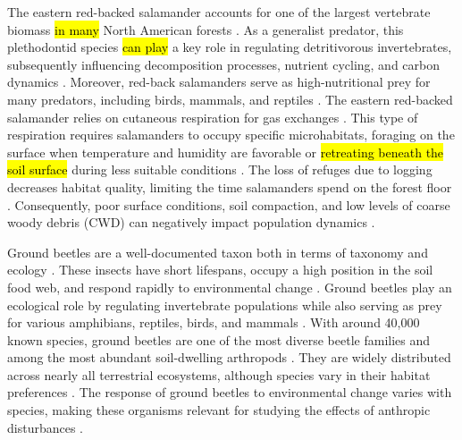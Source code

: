 The eastern red-backed salamander accounts for one of the largest vertebrate biomass \hl{in many} North American forests \citep{Burton1975Salamanderpopulations,Petranka1993Effectstimber,semlitschAbundanceBiomassProduction2014a}. 
As a generalist predator, this plethodontid species \hl{can play} a key role in regulating detritivorous invertebrates, subsequently influencing decomposition processes, nutrient cycling, and carbon dynamics \citep{Burton1975Energyflow,Wyman1998Experimentalassessment,Walton2013Topdownregulation,Hickerson2017Easternredbacked}. 
Moreover, red-back salamanders serve as high-nutritional prey for many predators, including birds, mammals, and reptiles \citep{Burton1975Energyflow,Pough1987abundancesalamanders}. 
The eastern red-backed salamander relies on cutaneous respiration for gas exchanges \citep{Heatwole1961Relationsubstrate}. 
This type of respiration requires salamanders to occupy specific microhabitats, foraging on the surface when temperature and humidity are favorable or \hl{retreating beneath the soil surface} during less suitable conditions \citep{Grizzell1949HibernationSite,FraserEmpiricalEvaluation1976,Jaeger1980MicrohabitatsTerrestrial}. 
The loss of refuges due to logging decreases habitat quality, limiting the time salamanders spend on the forest floor \citep{Achat2015Quantifyingconsequences,Peele2017Effectswoody}. 
Consequently, poor surface conditions, soil compaction, and low levels of coarse woody debris (CWD) can negatively impact population dynamics \citep{Peterman2014Spatialvariation}. 

Ground beetles are a well-documented taxon both in terms of taxonomy and ecology \citep{loveiEcologyBehaviorGround1996,Larochelle2003naturalhistory}. 
These insects have short lifespans, occupy a high position in the soil food web, and respond rapidly to environmental change \citep{loveiEcologyBehaviorGround1996}. 
Ground beetles play an ecological role by regulating invertebrate populations while also serving as prey for various amphibians, reptiles, birds, and mammals \citep{loveiEcologyBehaviorGround1996}. 
With around 40,000 known species, ground beetles are one of the most diverse beetle families and among the most abundant soil-dwelling arthropods \citep{Erwin1985taxonpulse,loveiEcologyBehaviorGround1996,Rochefort2006GroundBeetle}. 
They are widely distributed across nearly all terrestrial ecosystems, although species vary in their habitat preferences \citep{loveiEcologyBehaviorGround1996,kotzeFortyYearsCarabid2011a,Larochelle2003naturalhistory}. 
The response of ground beetles to environmental change varies with species, making these organisms relevant for studying the effects of anthropic disturbances \citep{Niemela2001Carabidbeetles,Rainio2003Groundbeetles,Work2008Evaluationcarabid}. 

